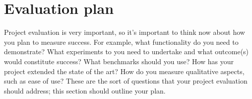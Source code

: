 \documentclass[12pt,twoside]{article}
\begin{document}
\newpage
\section{Evaluation plan}
Project evaluation is very important, so it's important to think now about how you plan to measure success. For example, what functionality do you need to demonstrate?  What experiments to you need to undertake and what outcome(s) would constitute success?  What benchmarks should you use? How has your project extended the state of the art?  How do you measure qualitative aspects, such as ease of use?  These are the sort of questions that your project evaluation should address; this section should outline your plan.


\end{document}
